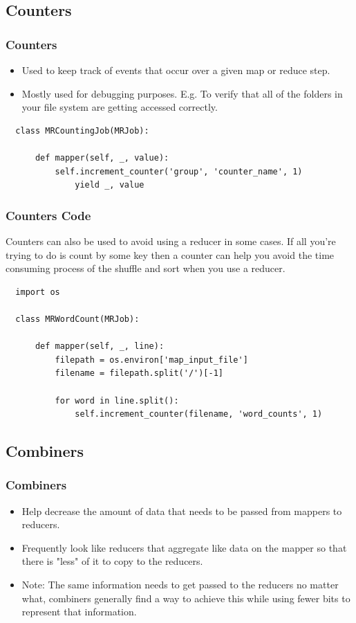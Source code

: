\documentclass{beamer}
\begin{document}
\subsection{Counters}
\begin{frame}[fragile]
  \frametitle{Counters}
  \begin{itemize}
    \item Used to keep track of events that occur over a given map or reduce step.
    \item Mostly used for debugging purposes. E.g. To verify that all of the folders in your file system are getting accessed correctly.
  \end{itemize} \vspace{2mm}
  \begin{lstlisting}
  class MRCountingJob(MRJob):

      def mapper(self, _, value):
          self.increment_counter('group', 'counter_name', 1)
              yield _, value
  \end{lstlisting}
\end{frame}

\begin{frame}[fragile]
  \frametitle{Counters Code}
  \parbox{\linewidth}{Counters can also be used to avoid using a reducer in some cases. If all you're trying to do is count by some key then a counter can help you avoid the time consuming process of the shuffle and sort when you use a reducer.}
  \vspace{2mm}
  \begin{lstlisting}
  import os

  class MRWordCount(MRJob):
    
      def mapper(self, _, line):
          filepath = os.environ['map_input_file']
          filename = filepath.split('/')[-1]

          for word in line.split():
              self.increment_counter(filename, 'word_counts', 1)
  \end{lstlisting}
\end{frame}

\subsection{Combiners}
\begin{frame}
  \frametitle{Combiners}
  \begin{itemize}
    \item Help decrease the amount of data that needs to be passed from mappers to reducers.
    \item Frequently look like reducers that aggregate like data on the mapper so that there is "less" of it to copy to the reducers.
    \item \alert{Note}: The same information needs to get passed to the reducers no matter what, combiners generally find a way to achieve this while using fewer bits to represent that information.
  \end{itemize}
\end{frame}
\end{document}
